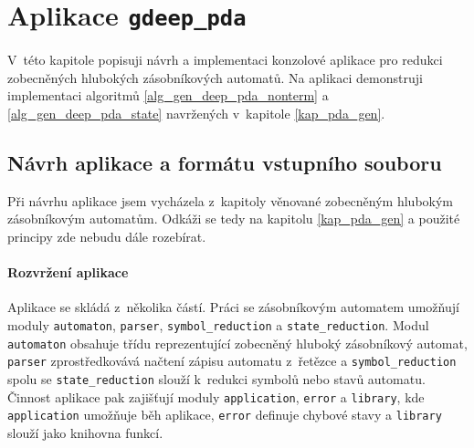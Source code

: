 
\chapter{Aplikace \texttt{gdeep\_pda}} \label{kap_aplikace}

V~této kapitole popisuji návrh a implementaci konzolové aplikace pro redukci zobecněných hlubokých zásobníkových automatů. Na aplikaci demonstruji implementaci algoritmů \ref{alg_gen_deep_pda_nonterm} a \ref{alg_gen_deep_pda_state} navržených v~kapitole \ref{kap_pda_gen}.


\section{Návrh aplikace a formátu vstupního souboru}


Při návrhu aplikace jsem vycházela z~kapitoly věnované zobecněným hlubokým zásobníkovým automatům. Odkáži se tedy na kapitolu \ref{kap_pda_gen} a použité principy zde nebudu dále rozebírat. %

\subsubsection{Rozvržení aplikace}\label{kap_aplikace_rozvrzeni}

Aplikace se skládá z~několika částí. Práci se zásobníkovým automatem umožňují moduly \texttt{automaton}, \texttt{parser}, \texttt{symbol\_reduction} a \texttt{state\_reduction}. 
Modul \texttt{automaton} obsahuje třídu reprezentující zobecněný hluboký zásobníkový automat, \texttt{parser} zprostředkovává načtení zápisu automatu z~řetězce a \texttt{symbol\_reduction} spolu se \texttt{state\_reduction} slouží k~redukci symbolů nebo stavů automatu.
Činnost aplikace pak zajišťují moduly \texttt{application}, \texttt{error} a \texttt{library}, kde \texttt{application} umožňuje běh aplikace, \texttt{error} definuje chybové stavy a \texttt{library} slouží jako knihovna funkcí.

